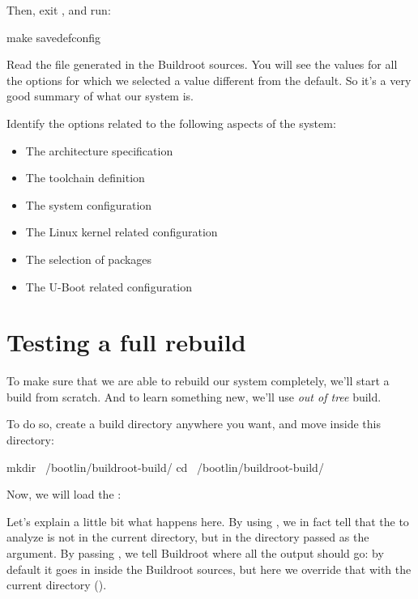 Then, exit , and run:

\begin{bashinput}
make savedefconfig
\end{bashinput}

Read the file  generated in the
Buildroot sources. You will see the values for all the options for
which we selected a value different from the default. So it's a very
good summary of what our system is.

Identify the options related to the following aspects of the system:

\begin{itemize}
\item The architecture specification
\item The toolchain definition
\item The system configuration
\item The Linux kernel related configuration
\item The selection of packages
\item The U-Boot related configuration
\end{itemize}

\section{Testing a full rebuild}

To make sure that we are able to rebuild our system completely, we'll
start a build from scratch. And to learn something new, we'll use {\em
  out of tree} build.

To do so, create a build directory anywhere you want, and move inside
this directory:

\begin{bashinput}
mkdir ~/bootlin/buildroot-build/
cd ~/bootlin/buildroot-build/
\end{bashinput}

Now, we will load the :


Let's explain a little bit what happens here. By using
, we in fact tell  that the
 to analyze is not in the current directory, but in the
directory passed as the  argument. By passing , we
tell Buildroot where all the output should go: by default it goes in
 inside the Buildroot sources, but here we override that
with the current directory ().

